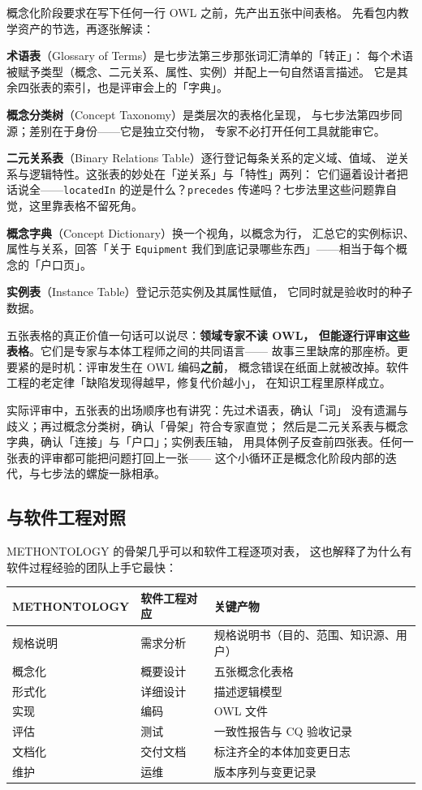 概念化阶段要求在写下任何一行 OWL 之前，先产出五张中间表格。
先看包内教学资产的节选，再逐张解读：



\textbf{术语表}（Glossary of Terms）是七步法第三步那张词汇清单的「转正」：
每个术语被赋予类型（概念、二元关系、属性、实例）并配上一句自然语言描述。
它是其余四张表的索引，也是评审会上的「字典」。

\textbf{概念分类树}（Concept Taxonomy）是类层次的表格化呈现，
与七步法第四步同源；差别在于身份——它是独立交付物，
专家不必打开任何工具就能审它。

\textbf{二元关系表}（Binary Relations Table）逐行登记每条关系的定义域、值域、
逆关系与逻辑特性。这张表的妙处在「逆关系」与「特性」两列：
它们逼着设计者把话说全——\texttt{locatedIn} 的逆是什么？\texttt{precedes}
传递吗？七步法里这些问题靠自觉，这里靠表格不留死角。

\textbf{概念字典}（Concept Dictionary）换一个视角，以概念为行，
汇总它的实例标识、属性与关系，回答「关于 \texttt{Equipment}
我们到底记录哪些东西」——相当于每个概念的「户口页」。

\textbf{实例表}（Instance Table）登记示范实例及其属性赋值，
它同时就是验收时的种子数据。

五张表格的真正价值一句话可以说尽：\textbf{领域专家不读 OWL，
但能逐行评审这些表格}。它们是专家与本体工程师之间的共同语言——
故事三里缺席的那座桥。更要紧的是时机：评审发生在 OWL 编码\textbf{之前}，
概念错误在纸面上就被改掉。软件工程的老定律「缺陷发现得越早，修复代价越小」，
在知识工程里原样成立。

实际评审中，五张表的出场顺序也有讲究：先过术语表，确认「词」
没有遗漏与歧义；再过概念分类树，确认「骨架」符合专家直觉；
然后是二元关系表与概念字典，确认「连接」与「户口」；实例表压轴，
用具体例子反查前四张表。任何一张表的评审都可能把问题打回上一张——
这个小循环正是概念化阶段内部的迭代，与七步法的螺旋一脉相承。

\subsection{与软件工程对照}

METHONTOLOGY 的骨架几乎可以和软件工程逐项对表，
这也解释了为什么有软件过程经验的团队上手它最快：

\begin{center}
\begin{tabularx}{\linewidth}{@{}llX@{}}
\toprule
\textbf{METHONTOLOGY} & \textbf{软件工程对应} & \textbf{关键产物} \\
\midrule
规格说明 & 需求分析 & 规格说明书（目的、范围、知识源、用户） \\
概念化 & 概要设计 & 五张概念化表格 \\
形式化 & 详细设计 & 描述逻辑模型 \\
实现 & 编码 & OWL 文件 \\
评估 & 测试 & 一致性报告与 CQ 验收记录 \\
文档化 & 交付文档 & 标注齐全的本体加变更日志 \\
维护 & 运维 & 版本序列与变更记录 \\
\bottomrule
\end{tabularx}
\end{center}

